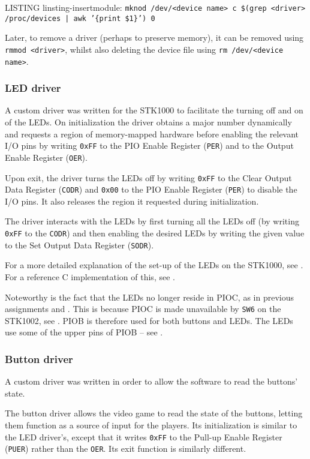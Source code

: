 LISTING linsting-insertmodule: \texttt{mknod /dev/<device name> c \$(grep <driver> /proc/devices | awk '\{print \$1\}') 0}

Later, to remove a driver (perhaps to preserve memory), it can be removed using \texttt{rmmod <driver>}, whilst also deleting the device file using \texttt{rm /dev/<device name>}.

\subsubsection{LED driver}
A custom driver was written for the STK1000 to facilitate the turning off and on of the LEDs.
On initialization the driver obtains a major number dynamically and requests a region of memory-mapped hardware before enabling the relevant I/O pins by writing \texttt{0xFF} to the PIO Enable Register (\texttt{PER}) and to the Output Enable Register (\texttt{OER}).

Upon exit, the driver turns the LEDs off by writing \texttt{0xFF} to the Clear Output Data Register (\texttt{CODR}) and \texttt{0x00} to the PIO Enable Register (\texttt{PER}) to disable the I/O pins.
It also releases the region it requested during initialization.

The driver interacts with the LEDs by first turning all the LEDs off (by writing \texttt{0xFF} to the \texttt{CODR}) and then enabling the desired LEDs by writing the given value to the Set Output Data Register (\texttt{SODR}).

For a more detailed explanation of the set-up of the LEDs on the STK1000, see \cite{tdt4258-1}.
For a reference C implementation of this, see \cite{tdt4258-2}.

Noteworthy is the fact that the LEDs no longer reside in PIOC, as in previous assignments \cite{tdt4258-1} and \cite{tdt4258-2}.
This is because PIOC is made unavailable by \texttt{SW6} on the STK1002, see \cite{lab-compendium}.
PIOB is therefore used for both buttons and LEDs.
The LEDs use some of the upper pins of PIOB -- see \cite{lab-compendium}.

\subsubsection{Button driver}
A custom driver was written in order to allow the software to read the buttons' state.

The button driver allows the video game to read the state of the buttons, letting them function as a source of input for the players.
Its initialization is similar to the LED driver's, except that it writes \texttt{0xFF} to the Pull-up Enable Register (\texttt{PUER}) rather than the \texttt{OER}.
Its exit function is similarly different.


